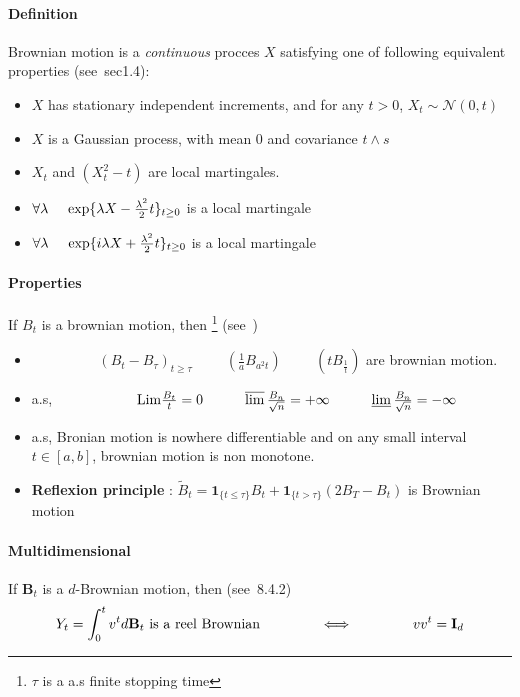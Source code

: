 \documentclass[a4paper,10pt]{article}
\begin{document}
\paragraph{Definition} Brownian motion is a \textit{continuous} procces $X$ satisfying one of following equivalent properties  (see~\cite{MONIQUE}sec1.4):
\begin{itemize}
 \item $X$ has stationary independent increments, and for any $t>0$, $X_t \sim \mathcal{N}(0,t)$
 \item $X$ is a Gaussian process, with mean 0 and covariance $t\wedge s$
 \item $X_t$ and $(X_t^2 - t)$ are local martingales.
 \item $\forall \lambda \hspace{0.5cm} \text{exp}\{  \lambda X - \frac{\lambda^2}{2}t \}_{t\geq0}$ is a local martingale
 \item $\forall \lambda \hspace{0.5cm} \text{exp}\{ i\lambda X + \frac{\lambda^2}{2}t \}_{t\geq0}$ is a local martingale
\end{itemize}
\paragraph{Properties}
If $B_t$ is a brownian motion, then \footnote{$\tau$ is a a.s finite stopping time} (see~\cite{PETER})
\begin{itemize}
 \item $\hspace{2cm} (B_t-B_{\tau})_{t\geq \tau} \hspace{1cm}  (\frac{1}{a}B_{a^2 t}) \hspace{1cm}  (tB_{\frac{1}{t}})$ are brownian motion.
 \item a.s, $\hspace{2cm} \text{Lim}\frac{B_t}{t} = 0   \hspace{1cm} \varlimsup\frac{B_n}{\sqrt{n}}=+\infty \hspace{1cm} \varliminf\frac{B_n}{\sqrt{n}}=-\infty$
 \item a.s, Bronian motion is nowhere differentiable and on any small interval $t\in[a,b]$, brownian motion is non monotone.
 \item \textbf{Reflexion principle} : $\tilde{B}_t = \mathbf{1}_{\{t\leq \tau\}} B_t + \mathbf{1}_{\{t>\tau\}} (2B_T - B_t) $ is Brownian motion  
\end{itemize}
\paragraph{Multidimensional}
If $\textbf{B}_t$ is a $d$-Brownian motion, then (see~\cite{OKSENDAL}8.4.2)
\[
Y_t = \int_0^t v^t d\textbf{B}_t \text{ is a reel Brownian} 
\hspace{1.5cm} \Longleftrightarrow \hspace{1.5cm}
vv^t = \textbf{I}_d
\]
\end{document}
